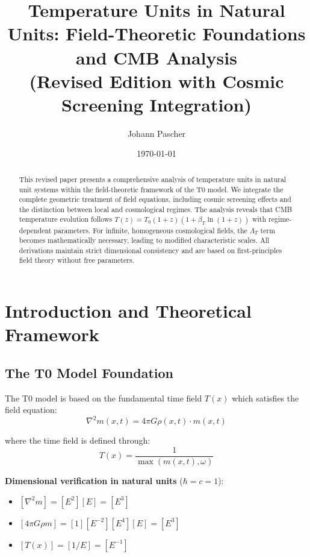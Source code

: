 \documentclass[12pt,a4paper]{article}
\newcommand{\Tfield}{T(x)}
\begin{document}
	
	\title{Temperature Units in Natural Units: Field-Theoretic Foundations and CMB Analysis \\
		(Revised Edition with Cosmic Screening Integration)}
	\author{Johann Pascher}
	\date{\today}
	
	\maketitle
	
	\begin{abstract}
		This revised paper presents a comprehensive analysis of temperature units in natural unit systems within the field-theoretic framework of the T0 model. We integrate the complete geometric treatment of field equations, including cosmic screening effects and the distinction between local and cosmological regimes. The analysis reveals that CMB temperature evolution follows $T(z) = T_0(1+z)(1 + \beta_T \ln(1+z))$ with regime-dependent parameters. For infinite, homogeneous cosmological fields, the $\Lambda_T$ term becomes mathematically necessary, leading to modified characteristic scales. All derivations maintain strict dimensional consistency and are based on first-principles field theory without free parameters.
	\end{abstract}
	
	\tableofcontents
	\newpage
	
	\section{Introduction and Theoretical Framework}
	\label{sec:introduction}
	
	\subsection{The T0 Model Foundation}
	\label{subsec:t0_foundation}
	
	The T0 model is based on the fundamental time field $\Tfield$ which satisfies the field equation:
	\begin{equation}
		\nabla^2 m(x,t) = 4\pi G \rho(x,t) \cdot m(x,t)
	\end{equation}
	
	where the time field is defined through:
	\begin{equation}
		\Tfield = \frac{1}{\max(m(x,t), \omega)}
	\end{equation}
	
	\textbf{Dimensional verification in natural units} ($\hbar = c = 1$):
	\begin{itemize}
		\item $[\nabla^2 m] = [E^2][E] = [E^3]$
		\item $[4\pi G \rho m] = [1][E^{-2}][E^4][E] = [E^3]$ \checkmark
		\item $[\Tfield] = [1/E] = [E^{-1}]$ \checkmark
	\end{itemize}
	
\end{document}
